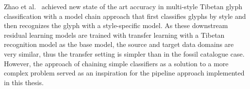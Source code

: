 \documentclass[english,twoside,openright]{UH_DS_MSc}
\begin{document}



Zhao et al.~\cite{4zhaoTibetan} achieved new state of the art accuracy in multi-style Tibetan glyph classification
with a model chain approach that first classifies glyphs by style and then recognizes the glyph with a style-specific model. As these downstream
 residual learning models are trained with transfer learning with a Tibetan 
 recognition model as the base model, the source and target data domains are very similar,
  thus the transfer setting is simpler than in the fossil catalogue case. However, the approach of 
  chaining simple classifiers as a solution to a more complex problem served as an inspiration for
   the pipeline approach implemented in this thesis.



\end{document}

